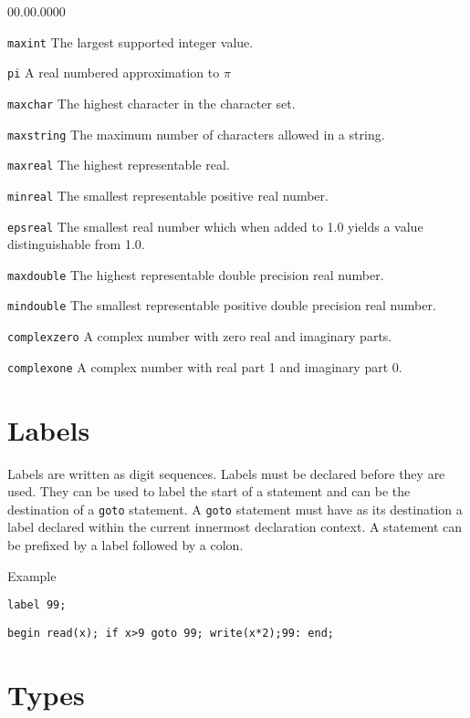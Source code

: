 \begin{lyxlist}{00.00.0000}
\item [\texttt{maxint\index{maxint}}]The largest supported integer value.
\item [\texttt{pi\index{pi}}] A real numbered approximation to $ \pi  $
\item [\texttt{maxchar\index{maxchar}}] The highest character in the character set.
\item [\texttt{maxstring\index{maxstring}}]The maximum number of characters allowed
in a string.
\item [\texttt{maxreal\index{maxreal}}]The highest representable real. 
\item [\texttt{minreal\index{minreal}}]The smallest representable positive real number. 
\item [\texttt{epsreal\index{epsreal}}]The smallest real number which when added
to 1.0 yields a value distinguishable from 1.0. 
\item [\texttt{maxdouble\index{maxdouble}}]The highest representable double precision
real number.
\item [\texttt{mindouble\index{mindouble}}]The smallest representable positive double
precision real number.
\item [\texttt{complexzero\index{complexzero}}]A complex number with zero real and
imaginary parts.
\item [\texttt{complexone}\index{complexone}]A complex number with real part 1 and
imaginary part 0.
\end{lyxlist}

\section{Labels}

Labels are written as digit sequences. Labels must be declared before they are
used. They can be used to label the start of a statement and can be the destination
of a \texttt{goto} statement. A \texttt{goto} statement must have
as its destination a label declared within the current innermost
declaration context. A statement can be prefixed by a label followed by a colon.

Example

\texttt{label 99;}

\texttt{begin read(x); if x>9 goto 99; write(x{*}2);99: end;}


\section{Types}

